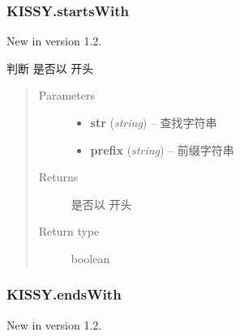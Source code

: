 \documentclass[letterpaper,10pt,english]{sphinxmanual}
\begin{document}
\subsubsection{KISSY.startsWith}
\label{api/seed/lang/startsWith:kissy-startswith}\label{api/seed/lang/startsWith::doc}New in version 1.2.

\begin{fulllineitems}
\label{api/seed/lang/startsWith:Lang.KISSY.startsWith}
判断  是否以  开头
\begin{quote}\begin{description}
\item[{Parameters}] \leavevmode\begin{itemize}
\item {}
\textbf{str} (\emph{string}) -- 查找字符串

\item {}
\textbf{prefix} (\emph{string}) -- 前缀字符串

\end{itemize}

\item[{Returns}] \leavevmode
{} 是否以  开头

\item[{Return type}] \leavevmode
boolean

\end{description}\end{quote}

\end{fulllineitems}



\subsubsection{KISSY.endsWith}
\label{api/seed/lang/endsWith:kissy-endswith}\label{api/seed/lang/endsWith::doc}New in version 1.2.
\end{document}
